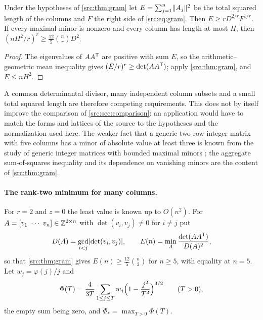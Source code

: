 \begin{corollary}\label{src:cor:gram}
Under the hypotheses of \cref{src:thm:gram} let $E=\sum_{j=1}^n\lVert A_j\rVert^2$ be the total
squared length of the columns and $F$ the right side of \eqref{src:eq:gram}. Then
$E\ge rD^{2/r}F^{1/r}$. If every maximal minor is nonzero and every column has length at most
$H$, then $(nH^2/r)^r\ge\tfrac{12}5\binom nrD^2$.
\end{corollary}

\begin{proof}
The eigenvalues of $AA^{\mathsf{T}}$ are positive with sum $E$, so the arithmetic--geometric mean
inequality gives $(E/r)^r\ge\det(AA^{\mathsf{T}})$; apply \cref{src:thm:gram}, and $E\le nH^2$.
\end{proof}

A common determinantal divisor, many independent column subsets and a small total squared
length are therefore competing requirements. This does not by itself improve the comparison of
\cref{src:sec:comparison}: an application would have to match the forms and lattices of the
source to the hypotheses and the normalization used here. The weaker fact that a generic
two-row integer matrix with five columns has a minor of absolute value at least three is known
from the study of generic integer matrices with bounded maximal minors
\cite{KriepkeKyureghyanSchymura2023Size,KriepkeSchymura2025Generic}; the aggregate
sum-of-squares inequality and its dependence on vanishing minors are the content of
\cref{src:thm:gram}.

\paragraph{The rank-two minimum for many columns.} For $r=2$ and $z=0$ the least value is known up to
$O(n^2)$. For $A=[v_1\ \cdots\ v_n]\in\mathbb{Z}^{2\times n}$ with $\det(v_i,v_j)\ne0$ for $i\ne j$ put
\[
 D(A)=\gcd_{i<j}\lvert\det(v_i,v_j)\rvert,\qquad E(n)=\min_A\frac{\det(AA^{\mathsf{T}})}{D(A)^2},
\]
so that \cref{src:thm:gram} gives $E(n)\ge\frac{12}5\binom n2$ for $n\ge5$, with equality at $n=5$. Let
$w_j=\varphi(j)/j$ and
\begin{equation}\label{src:eq:gramPhi}
 \Phi(T)=\frac4{3T}\sum_{1\le j\le T}w_j\Bigl(1-\frac{j^2}{T^2}\Bigr)^{3/2}\qquad(T>0),
\end{equation}
the empty sum being zero, and $\Phi_*=\max_{T>0}\Phi(T)$.

